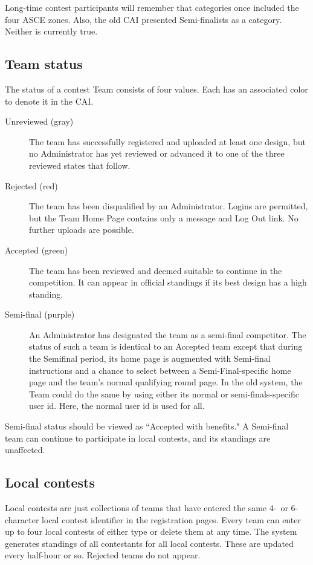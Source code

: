 \documentclass[11pt,letterpaper]{refart}
\begin{document}
Long-time contest participants will remember that categories once included the
four ASCE zones. Also, the old CAI presented Semi-finalists as a category.
Neither is currently true.

\subsection{Team status}
The status of a contest Team consists of four values.  
Each has an associated color to denote
it in the CAI.
\begin{description}
\item[Unreviewed (gray)] The team has successfully registered and 
uploaded at least one design,
but no Administrator has yet reviewed or advanced it to one of the three reviewed
states that follow.
\item[Rejected (red)] The team has been disqualified by an Administrator. 
Logins are permitted, but the Team Home Page contains only a message 
and Log Out link.  No further uploads are possible.
\item[Accepted (green)] The team has been reviewed and deemed suitable
to continue in the competition. It can appear in official standings if its best
design has a high standing.
\item[Semi-final (purple)] An Administrator has designated the team as
a semi-final competitor.  The status of such a team is identical to an Accepted
team except that during the Semifinal period, its home page is augmented
with Semi-final instructions and a chance to select between a Semi-Final-specific
home page and the team's normal qualifying round page.  In the old system, the
Team could do the same by using either its normal or semi-finals-specific
user id.  Here, the normal user id is used for all.
\end{description}
Semi-final status should be viewed as ``Accepted with benefits."  A Semi-final
team can continue to participate in local contests, and its standings are 
unaffected.

\subsection{Local contests}
Local contests are just collections of teams that have entered the same
4-\ or 6-character local contest identifier in the registration pages. Every
team can enter up to four local contests of either type or delete them 
at any time.  The  system generates standings of all contestants for 
all local contests.  These are updated every half-hour or so.  Rejected teams 
do not appear.
\end{document}
